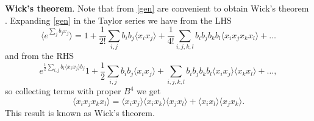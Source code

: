

\textbf{Wick's theorem}. Note that from \eqref{gen} are convenient to obtain Wick’s theorem . Expanding \eqref{gen} in the Taylor series we have from the LHS
\begin{equation*}
	\langle e^{\sum_j b_j x_j}\rangle = 1 + \frac{1}{2!} \sum_{i,j} b_i b_j \langle x_i x_j\rangle + \frac{1}{4!}  \sum_{i,j,k,l} b_i b_j b_k b_l \langle x_i x_j x_k x_l\rangle + \ldots
\end{equation*}
and from the RHS 
\begin{equation*}
	e^{\frac{1}{2}\sum_{i,j} b_i \langle x_i x_j \rangle b_j} 1 + \frac{1}{2} \sum_{i,j} b_i b_j \langle x_i x_j\rangle + \sum_{i,j,k,l} b_i b_j b_k b_l \langle x_i x_j\rangle \langle x_k x_l\rangle + \ldots,
\end{equation*}
so collecting terms with proper $B^4$ we get
\begin{equation*}
	\langle x_i x_j x_k x_l\rangle = \langle x_i x_j\rangle \langle x_i x_k\rangle \langle x_j x_l\rangle + \langle x_i x_l\rangle \langle x_j x_k\rangle.
\end{equation*}
This result is known as Wick's theorem.